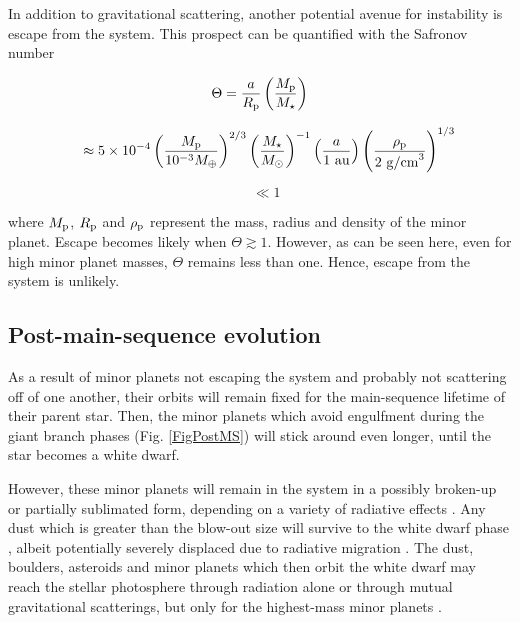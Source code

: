 \documentclass[useAMS,usenatbib]{mn2e}
\begin{document}
In addition to gravitational scattering, another potential avenue for instability is escape from the system. This prospect can be quantified with the Safronov number \citep{safronov1972}

\[
\Theta = \frac{a}{R_{\rm p}}\left(\frac{M_{\rm p}}{M_{\star}} \right)
\]

\[
\ \ \ \
\approx 5 \times 10^{-4} \left(\frac{M_{\rm p}}{10^{-3}M_{\oplus}} \right)^{2/3}
                         \left(\frac{M_{\star}}{M_{\odot}} \right)^{-1}
                         \left(\frac{a}{1~{\rm au}}\right)
                         \left(\frac{\rho_{\rm p}}{2~{\rm g/cm}^3} \right)^{1/3} 
\]

\begin{equation}
\ \ \ \ 
\ll 1
\end{equation}

\noindent{}where $M_{\rm p}$, $R_{\rm p}$ and $\rho_{\rm p}$ represent the mass, radius and density of the minor planet. Escape becomes likely when $\Theta \gtrsim 1$. However, as can be seen here, even for high minor planet masses, $\Theta$ remains less than one. Hence, escape from the system is unlikely.


\subsection{Post-main-sequence evolution}

As a result of minor planets not escaping the system and probably not scattering off of one another, their orbits will remain fixed for the main-sequence lifetime of their parent star. Then, the minor planets which avoid engulfment during the giant branch phases (Fig. \ref{FigPostMS}) will stick around even longer, until the star becomes a white dwarf.

However, these minor planets will remain in the system in a possibly broken-up or partially sublimated form, depending on a variety of radiative effects \citep{jurxu2010,juretal2012,veretal2014,veretal2015,veretal2019,versch2020,malper2016,malper2017a,malper2017b,katz2018,lietal2024}. Any dust which is greater than the blow-out size will survive to the white dwarf phase \citep{bonwya2010,donetal2010,zotver2020}, albeit potentially severely displaced due to radiative migration \citep{veretal2015,veretal2019}. The dust, boulders, asteroids and minor planets which then orbit the white dwarf may reach the stellar photosphere through radiation alone \citep{veretal2022} or through mutual gravitational scatterings, but only for the highest-mass minor planets \citep{verros2023}.
\end{document}
